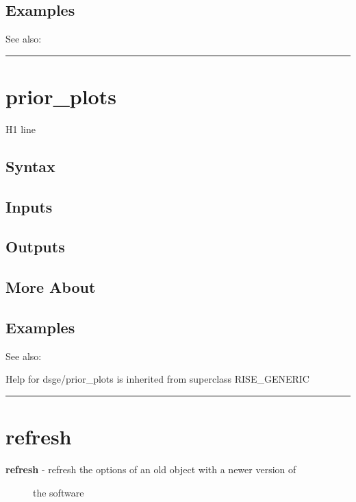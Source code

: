 \documentclass[letterpaper,10pt,english]{sphinxmanual}
\begin{document}
\subsection{Examples}
\label{classes/models/@dsge/dsge:id153}
See also:


\bigskip\hrule{}\bigskip



\section{prior\_plots}
\label{classes/models/@dsge/dsge:id154}\label{classes/models/@dsge/dsge:prior-plots}
H1 line


\subsection{Syntax}
\label{classes/models/@dsge/dsge:id155}

\subsection{Inputs}
\label{classes/models/@dsge/dsge:id156}

\subsection{Outputs}
\label{classes/models/@dsge/dsge:id157}

\subsection{More About}
\label{classes/models/@dsge/dsge:id158}

\subsection{Examples}
\label{classes/models/@dsge/dsge:id159}
See also:

Help for dsge/prior\_plots is inherited from superclass RISE\_GENERIC


\bigskip\hrule{}\bigskip



\section{refresh}
\label{classes/models/@dsge/dsge:id160}\label{classes/models/@dsge/dsge:refresh}\begin{description}
\item[{\textbf{refresh} - refresh the options of an old object with a newer version of}] \leavevmode
the software

\end{description}
\end{document}
